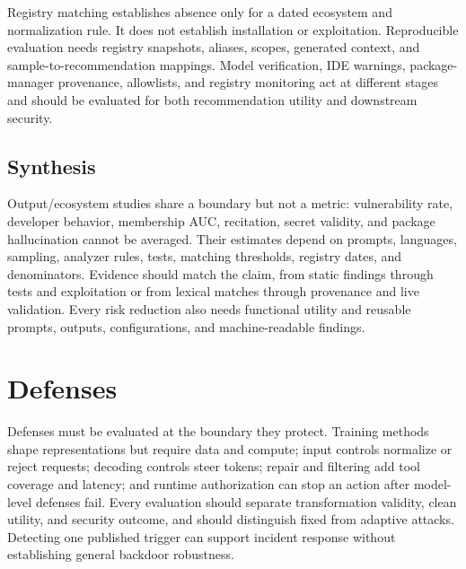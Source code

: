 \documentclass[acmsmall,screen,review]{acmart}
\begin{document}
Registry matching establishes absence only for a dated ecosystem and normalization rule. It does not establish installation or exploitation. Reproducible evaluation needs registry snapshots, aliases, scopes, generated context, and sample-to-recommendation mappings. Model verification, IDE warnings, package-manager provenance, allowlists, and registry monitoring act at different stages and should be evaluated for both recommendation utility and downstream security.

\subsection{Synthesis} \label{sec:gensec:discussion}
Output/ecosystem studies share a boundary but not a metric: vulnerability rate, developer behavior, membership AUC, recitation, secret validity, and package hallucination cannot be averaged. Their estimates depend on prompts, languages, sampling, analyzer rules, tests, matching thresholds, registry dates, and denominators. Evidence should match the claim, from static findings through tests and exploitation or from lexical matches through provenance and live validation. Every risk reduction also needs functional utility and reusable prompts, outputs, configurations, and machine-readable findings.

\section{Defenses} \label{sec:defense}

Defenses must be evaluated at the boundary they protect. Training methods shape representations but require data and compute; input controls normalize or reject requests; decoding controls steer tokens; repair and filtering add tool coverage and latency; and runtime authorization can stop an action after model-level defenses fail. Every evaluation should separate transformation validity, clean utility, and security outcome, and should distinguish fixed from adaptive attacks. Detecting one published trigger can support incident response without establishing general backdoor robustness.
\end{document}
